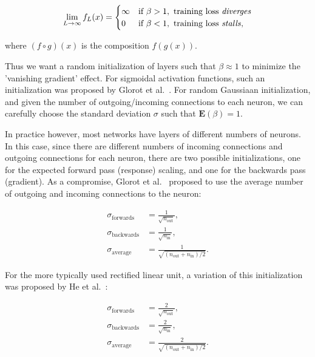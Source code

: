 \documentclass[thesis]{subfiles}
\begin{document}
\[
\lim_{L\to\infty} f_L(x) = 
\begin{cases}
\infty & \text{if } \beta > 1, \text{ training loss \emph{diverges}}\\
0 & \text{if } \beta < 1, \text{ training loss \emph{stalls}},
\end{cases}
\]

where $(f \circ g)(x)$ is the composition $f(g(x))$.

Thus we want a random initialization of layers such that $\beta\approx 1$ to minimize the 'vanishing gradient' effect. For sigmoidal activation functions, such an initialization was proposed by Glorot et al.~\citep{glorot2010understanding}. For random Gaussiaan initialization, and given the number of outgoing/incoming connections to each neuron, we can carefully choose the standard deviation $\sigma$ such that $\mathbf{E}(\beta) = 1$. 

In practice however, most networks have layers of different numbers of neurons. In this case, since there are different numbers of incoming connections and outgoing connections for each neuron, there are two possible initializations, one for the expected forward pass (response) scaling, and one for the backwards pass (gradient). As a compromise, Glorot et al.~\citep{glorot2010understanding} proposed to use the average number of outgoing and incoming connections to the neuron:

\begin{equation}
\begin{aligned}
	\sigma_{\textrm{forwards}} &= \frac{1}{\sqrt{n_{\text{out}}}},\\
	\sigma_{\textrm{backwards}} &= \frac{1}{\sqrt{n_{\text{in}}}},\\
	\sigma_{\textrm{average}} &= \frac{1}{\sqrt{(n_{\text{out}} + n_{\text{in}})/2}}.
\end{aligned}
\end{equation}

For the more typically used rectified linear unit, a variation of this initialization was proposed by He et al.~\citep{He2015b}:

\begin{equation}
\begin{aligned}
	\sigma_{\textrm{forwards}} &= \frac{2}{\sqrt{n_{\text{out}}}},\\
	\sigma_{\textrm{backwards}} &= \frac{2}{\sqrt{n_{\text{in}}}},\\
	\sigma_{\textrm{average}} &= \frac{2}{\sqrt{(n_{\text{out}} + n_{\text{in}})/2}}.
\end{aligned}
\end{equation}
\end{document}
